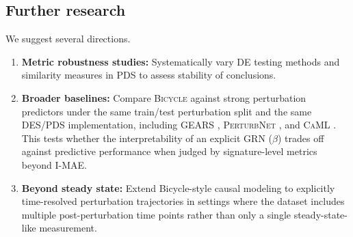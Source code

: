 \documentclass[12pt]{article}
\begin{document}
\subsection{Further research}
We suggest several directions.
\begin{enumerate}
    \item \textbf{Metric robustness studies:} Systematically vary DE testing methods and similarity
    measures in PDS to assess stability of conclusions.
    \item \textbf{Broader baselines:} Compare \textsc{Bicycle} against strong perturbation predictors under the same train/test perturbation split and the same DES/PDS implementation, including \textsc{GEARS} \cite{roohani2024gears}, \textsc{PerturbNet} \cite{yu2025perturbnet}, and \textsc{CaML} \cite{nilforoshan2023zeroshot}. This tests whether the interpretability of an explicit GRN (\(\beta\)) trades off against predictive performance when judged by signature-level metrics beyond I-MAE.
    \item \textbf{Beyond steady state:} Extend Bicycle-style causal modeling to explicitly time-resolved
perturbation trajectories in settings where the dataset includes multiple post-perturbation time
points rather than only a single steady-state-like measurement.
\end{enumerate}

\newpage


\end{document}

